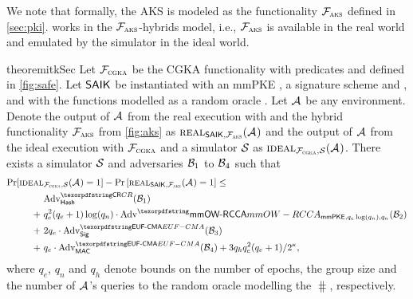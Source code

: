 We note that formally, the AKS is modeled as the functionality $\funcPKI$ defined in \cref{sec:pki}. \saik
works in the $\funcPKI$-hybrids model, i.e., $\funcPKI$ is available in the real world and emulated by the simulator in the ideal world.

\newcommand{\ucideal}{\textnormal{\textsc{ideal}}}
\newcommand{\ucreal}{\textnormal{\textsc{real}}}
\begin{restatable}{theorem}{itkSec}
	Let $\funcCGKA$ be the CGKA functionality with predicates \KwConf{} and \KwAuth{} defined in \cref{fig:safe}. Let $\saik$ be instantiated with an mmPKE \mmPKE, a signature scheme \sigscheme and \mac, and with the \hkdf functions modelled as a random oracle \hash.
	Let $\Adv$ be any environment. Denote the output of $\Adv$ from the real execution with \saik and the hybrid functionality $\funcPKI$ from \cref{fig:aks} as $\ucreal_{\saik, \funcPKI}(\Adv)$ and the output of $\Adv$ from the ideal execution with $\funcCGKA$ and a simulator $\ucsim$ as $\ucideal_{\funcCGKA, \ucsim}(\Adv)$.
	There exists a simulator $\ucsim$ and adversaries $\Bdv[1]$ to $\Bdv[4]$ such that
	\begin{align*}
		\Pr[\ucideal&_{\funcCGKA, \ucsim}(\Adv) = 1] - \Pr\left[\ucreal_{\saik, \funcPKI}(\Adv) = 1\right] \leq \\
		&\textnormal{Adv}^{\gamefont{CR}}_{\hash}(\Bdv[1]) \\
		+\ & q_e^2(q_e+1) \log(q_n) \cdot\textnormal{Adv}^\mmowrcca_{\mmPKE,q_e\log(q_n),q_n}(\Bdv[2]) \\
		+\ & 2q_e\cdot \textnormal{Adv}^{\ufcma}_\sigscheme(\Bdv[3]) \\
		+\ & q_e \cdot \textnormal{Adv}^{\ufcma}_\mac(\Bdv[4]) + 3q_hq_e^2(q_e+1)/2^\kappa,
	\end{align*}
	where $q_e$, $q_n$ and $q_h$ denote bounds on the number of epochs, the group size and the number of $\Adv$'s queries to the random oracle modelling the $\hash$, respectively.
\end{restatable}

